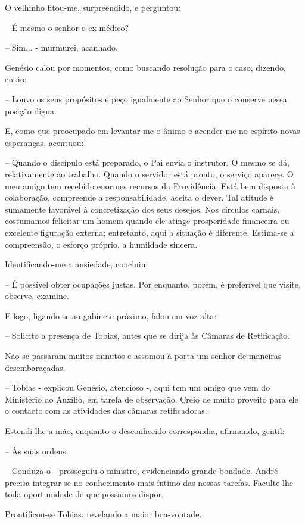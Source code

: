 \documentclass[portuguese,12pt,a4paper]{scrbook}
\begin{document}
	O velhinho fitou-me, surpreendido, e perguntou:
	
	– É mesmo o senhor o ex-médico?
	
	– Sim... - murmurei, acanhado.
	
	Genésio calou por momentos, como buscando resolução para o caso, dizendo, então:
	
	– Louvo os seus propósitos e peço igualmente ao Senhor que o conserve nessa posição digna.
	
	E, como que preocupado em levantar-me o ânimo e acender-me no espírito novas esperanças, acentuou:
	
	– Quando o discípulo está preparado, o Pai envia o instrutor. O mesmo se dá, relativamente ao trabalho. Quando o servidor está pronto, o serviço aparece. O meu amigo tem recebido enormes recursos da Providência. Está bem disposto à colaboração, compreende a responsabilidade, aceita o dever. Tal atitude é sumamente favorável à concretização dos seus desejos. Nos círculos carnais, costumamos felicitar um homem quando ele atinge prosperidade financeira ou excelente figuração externa; entretanto, aqui a situação é diferente. Estima-se a compreensão, o esforço próprio, a humildade sincera.
	
	Identificando-me a ansiedade, concluiu:
	
	
	– É possível obter ocupações justas. Por enquanto, porém, é preferível que visite, observe, examine.
	
	E logo, ligando-se ao gabinete próximo, falou em voz alta:
	
	– Solicito a presença de Tobias, antes que se dirija às Câmaras de Retificação.
	
	Não se passaram muitos minutos e assomou à porta um senhor de maneiras desembaraçadas.
	
	– Tobias - explicou Genésio, atencioso -, aqui tem um amigo que vem do Ministério do Auxílio, em tarefa de observação. Creio de muito proveito para ele o contacto com as atividades das câmaras retificadoras.
	
	Estendi-lhe a mão, enquanto o desconhecido correspondia, afirmando, gentil:
	
	– Às suas ordens.
	
	– Conduza-o - prosseguiu o ministro, evidenciando grande bondade. André precisa integrar-se no conhecimento mais íntimo das nossas tarefas. Faculte-lhe toda oportunidade de que possamos dispor.
	
	Prontificou-se Tobias, revelando a maior boa-vontade.
	
\end{document}
